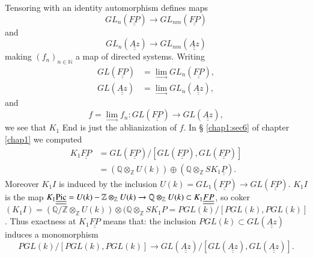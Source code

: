 Tensoring with an identity automorphism defines maps  
$$
GL_n (\underline{\underline{FP}})  \to GL_{nm}
(\underline{\underline{FP}}) 
$$
and\pageoriginale
$$
GL_n (\underline{\underline{Az}}) \to GL_{nm}
(\underline{\underline{Az}}) 
$$
making $(f_n)_{n \in \mathbb{N}}$ a map of directed systems. Writing  
\begin{align*}
GL ( \underline{\underline{FP}}) & = \lim_\to GL_{n}
(\underline{\underline{FP}}),\\ 
GL ( \underline{\underline{Az}}) & = \lim_\to GL_{n}
(\underline{\underline{Az}}), 
\end{align*}
and 
$$
f = \lim_{ \to } f_n : GL(\underline{\underline{FP}}) \to
GL(\underline{\underline{Az}}),  
$$
we see that $K_1$ End is just the ablianization of $f$. In \S
\ref{chap1:sec6} of chapter \ref{chap1} we computed  
\begin{align*}
K_1 \underline{\underline{FP}} & = GL(\underline{\underline{FP}})/
[GL(\underline{\underline{FP}}), GL(\underline{\underline{FP}})] \\ 
& = (\mathbb{Q} \otimes_{ \mathbb{Z}} U(k)) \oplus (\mathbb{Q}
\otimes_{\mathbb{Z}} SK_1 \underline{\underline{P}}).   
\end{align*}
Moreover $K_1I$ is induced by the inclusion $U(k) = GL_1
(\underline{\underline{FP}}) \to GL (\underline{\underline{FP}})$. $K_1
I$ is the map $K_1 \underline{\underline{\operatorname{Pic}}} = U(k) -
\mathbb{Z}\otimes_\mathbb{Z} U(k) \to \mathbb{Q} \otimes_{\mathbb{Z}}
U(k) \subset K_1 \underline{\underline{FP}}$, so coker $(K_1 I) =
(\mathbb{Q} / \mathbb{Z} \otimes_{\mathbb{Z}} U (k)) \otimes ( \mathbb{Q}
\otimes_\mathbb{Z} SK_1 P = PGL(k)/ [ PGL (k), PGL(k)]$. Thus
exactness at $K_1 \underline{\underline{FP}}$ means that: the
inclusion $PGL(k) \subset GL(\underline{\underline{Az}})$ induces a
monomorphism 
$$ 
PGL(k) / [PGL (k), PGL (k)] \to GL (\underline{\underline{Az}}) / [
  GL(\underline{\underline{Az}}), GL(\underline{\underline{Az}})].  
$$ 

